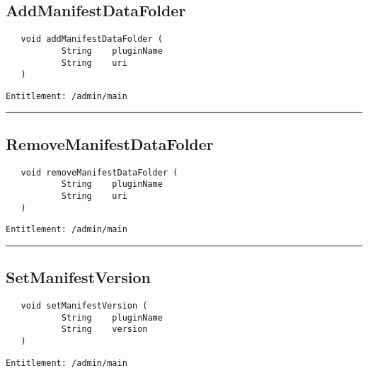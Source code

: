 \subsection{AddManifestDataFolder}
\label{Api:AddManifestDataFolder}
\begin{Verbatim}
   void addManifestDataFolder (
           String    pluginName
           String    uri
   )
\end{Verbatim}
\begin{Verbatim}[formatcom=\color{Maroon}]
  Entitlement: /admin/main
\end{Verbatim}



\rule{12cm}{2pt}
\subsection{RemoveManifestDataFolder}
\label{Api:RemoveManifestDataFolder}
\begin{Verbatim}
   void removeManifestDataFolder (
           String    pluginName
           String    uri
   )
\end{Verbatim}
\begin{Verbatim}[formatcom=\color{Maroon}]
  Entitlement: /admin/main
\end{Verbatim}



\rule{12cm}{2pt}
\subsection{SetManifestVersion}
\label{Api:SetManifestVersion}
\begin{Verbatim}
   void setManifestVersion (
           String    pluginName
           String    version
   )
\end{Verbatim}
\begin{Verbatim}[formatcom=\color{Maroon}]
  Entitlement: /admin/main
\end{Verbatim}



